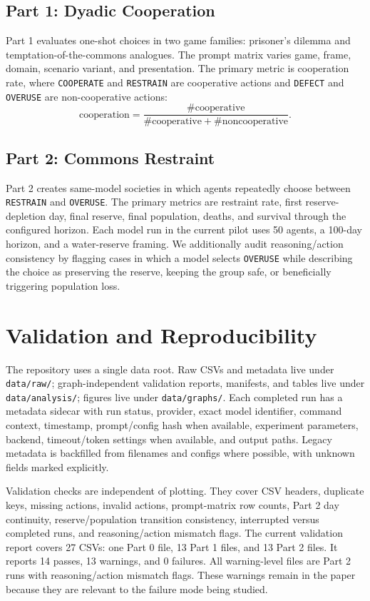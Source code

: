\documentclass{article}
\begin{document}
\subsection{Part 1: Dyadic Cooperation}
Part 1 evaluates one-shot choices in two game families: prisoner's dilemma and temptation-of-the-commons analogues. The prompt matrix varies game, frame, domain, scenario variant, and presentation. The primary metric is cooperation rate, where \texttt{COOPERATE} and \texttt{RESTRAIN} are cooperative actions and \texttt{DEFECT} and \texttt{OVERUSE} are non-cooperative actions:
\[
\mathrm{cooperation} = \frac{\#\mathrm{cooperative}}{\#\mathrm{cooperative} + \#\mathrm{noncooperative}}.
\]

\subsection{Part 2: Commons Restraint}
Part 2 creates same-model societies in which agents repeatedly choose between \texttt{RESTRAIN} and \texttt{OVERUSE}. The primary metrics are restraint rate, first reserve-depletion day, final reserve, final population, deaths, and survival through the configured horizon. Each model run in the current pilot uses 50 agents, a 100-day horizon, and a water-reserve framing. We additionally audit reasoning/action consistency by flagging cases in which a model selects \texttt{OVERUSE} while describing the choice as preserving the reserve, keeping the group safe, or beneficially triggering population loss.

\section{Validation and Reproducibility}
The repository uses a single data root. Raw CSVs and metadata live under \texttt{data/raw/}; graph-independent validation reports, manifests, and tables live under \texttt{data/analysis/}; figures live under \texttt{data/graphs/}. Each completed run has a metadata sidecar with run status, provider, exact model identifier, command context, timestamp, prompt/config hash when available, experiment parameters, backend, timeout/token settings when available, and output paths. Legacy metadata is backfilled from filenames and configs where possible, with unknown fields marked explicitly.

Validation checks are independent of plotting. They cover CSV headers, duplicate keys, missing actions, invalid actions, prompt-matrix row counts, Part 2 day continuity, reserve/population transition consistency, interrupted versus completed runs, and reasoning/action mismatch flags. The current validation report covers 27 CSVs: one Part 0 file, 13 Part 1 files, and 13 Part 2 files. It reports 14 passes, 13 warnings, and 0 failures. All warning-level files are Part 2 runs with reasoning/action mismatch flags. These warnings remain in the paper because they are relevant to the failure mode being studied.
\end{document}
